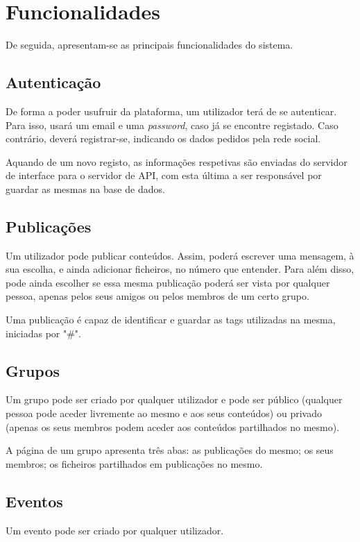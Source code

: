 \documentclass[a4paper]{report}
\begin{document}
	\section{Funcionalidades}
    De seguida, apresentam-se as principais funcionalidades do sistema.
	
	\subsection{Autenticação}
    De forma a poder usufruir da plataforma, um utilizador terá de se autenticar. Para isso, usará um email e uma \textit{password}, caso já se encontre registado.
    Caso contrário, deverá registrar-se, indicando os dados pedidos pela rede social.

    Aquando de um novo registo, as informações respetivas são enviadas do servidor de interface para o servidor de API, com esta última a ser responsável por guardar as mesmas na base de dados.


	\subsection{Publicações}
    Um utilizador pode publicar conteúdos. Assim, poderá escrever uma mensagem, à sua escolha, e ainda adicionar ficheiros, no número que entender. 
    Para além disso, pode ainda escolher se essa mesma publicação poderá ser vista por qualquer pessoa, apenas pelos seus amigos ou pelos membros de um certo grupo.

    Uma publicação é capaz de identificar e guardar as tags utilizadas na mesma, iniciadas por "#".


    \subsection{Grupos}
    Um grupo pode ser criado por qualquer utilizador e pode ser público (qualquer pessoa pode aceder livremente ao mesmo e aos seus conteúdos) ou privado (apenas os seus membros podem aceder aos conteúdos partilhados no mesmo).

    A página de um grupo apresenta três abas: as publicações do mesmo; os seus membros; os ficheiros partilhados em publicações no mesmo.


    \subsection{Eventos}
    Um evento pode ser criado por qualquer utilizador.
\end{document}
